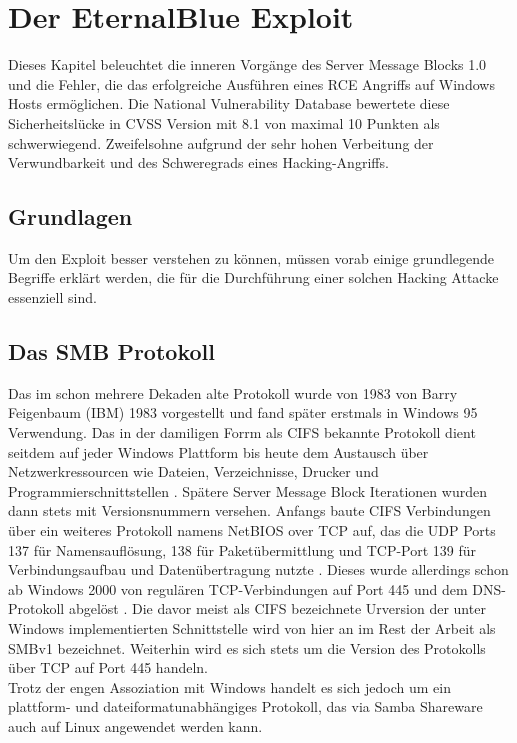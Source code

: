 \documentclass[DIV=12,headings=normal,pdftex,headinclude=false,footinclude=false,final]{scrreprt}
\begin{document}
\chapter{Der EternalBlue Exploit}
Dieses Kapitel beleuchtet die inneren Vorgänge des Server Message Blocks 1.0 und die Fehler, die das erfolgreiche Ausführen eines RCE Angriffs auf Windows Hosts ermöglichen. Die National Vulnerability Database bewertete diese Sicherheitslücke in CVSS Version mit 8.1 von maximal 10 Punkten \cite{NVD} als schwerwiegend. Zweifelsohne aufgrund der sehr hohen Verbeitung der Verwundbarkeit und des Schweregrads eines Hacking-Angriffs. 

\section{Grundlagen}
Um den Exploit besser verstehen zu können, müssen vorab einige grundlegende Begriffe erklärt werden, die für die Durchführung einer solchen Hacking Attacke essenziell sind.

\section{Das SMB Protokoll}
Das im schon mehrere Dekaden alte Protokoll wurde von 1983 von Barry Feigenbaum (IBM) 1983 vorgestellt und fand später erstmals in Windows 95 Verwendung. Das in der damiligen Forrm als CIFS bekannte Protokoll dient seitdem auf jeder Windows Plattform bis heute dem Austausch über Netzwerkressourcen wie Dateien, Verzeichnisse, Drucker und Programmierschnittstellen \cite{CompWeek:SMB}. Spätere Server Message Block Iterationen wurden dann stets mit Versionsnummern versehen. Anfangs baute CIFS Verbindungen über ein weiteres Protokoll namens NetBIOS over TCP auf, das die UDP Ports 137 für Namensauflösung, 138 für Paketübermittlung und TCP-Port 139 für Verbindungsaufbau und Datenübertragung nutzte \cite{MS:NetBIOS}. Dieses wurde allerdings schon ab Windows 2000 von regulären TCP-Verbindungen auf Port 445 und dem DNS-Protokoll abgelöst \cite{IONOS}. Die davor meist als CIFS bezeichnete Urversion der unter Windows implementierten Schnittstelle wird von hier an im Rest der Arbeit als SMBv1 bezeichnet. Weiterhin wird es sich stets um die Version des Protokolls über TCP auf Port 445 handeln.\\
Trotz der engen Assoziation mit Windows handelt es sich jedoch um ein plattform- und dateiformatunabhängiges Protokoll, das via Samba Shareware auch auf Linux angewendet werden kann\cite{IONOS}. 
\end{document}
